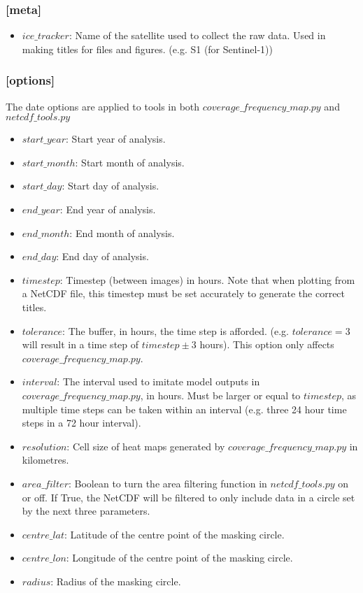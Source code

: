 \documentclass[12pt]{article}
\begin{document}
\subsubsection*{[meta]}

\begin{itemize}
    \item $ice\_tracker$: Name of the satellite used to collect the raw data. Used in making titles for files and figures. (e.g. S1 (for Sentinel-1))
\end{itemize}

\subsubsection*{[options]}

The date options are applied to tools in both $coverage\_frequency\_map.py$ and $netcdf\_tools.py$
\begin{itemize}
    \item $start\_year$: Start year of analysis. 
    \item $start\_month$: Start month of analysis.
    \item $start\_day$: Start day of analysis.
    \item $end\_year$: End year of analysis.
    \item $end\_month$: End month of analysis.
    \item $end\_day$: End day of analysis.
    \item $timestep$: Timestep (between images) in hours. Note that when plotting from a NetCDF file, this timestep must be set accurately to generate the correct titles.
    \item $tolerance$: The buffer, in hours, the time step is afforded. (e.g. $tolerance = 3$ will result in a time step of $timestep \pm 3$ hours). This option only affects $coverage\_frequency\_map.py$.
    \item $interval$: The interval used to imitate model outputs in $coverage\_frequency\_map.py$, in hours. Must be larger or equal to $timestep$, as multiple time steps can be taken within an interval (e.g. three 24 hour time steps in a 72 hour interval).
    \item $resolution$: Cell size of heat maps generated by $coverage\_frequency\_map.py$ in kilometres.
    \item $area\_filter$: Boolean to turn the area filtering function in $netcdf\_tools.py$ on or off. If True, the NetCDF will be filtered to only include data in a circle set by the next three parameters.
    \item $centre\_lat$: Latitude of the centre point of the masking circle.
    \item $centre\_lon$: Longitude of the centre point of the masking circle.
    \item $radius$: Radius of the masking circle.
\end{itemize}
\end{document}
